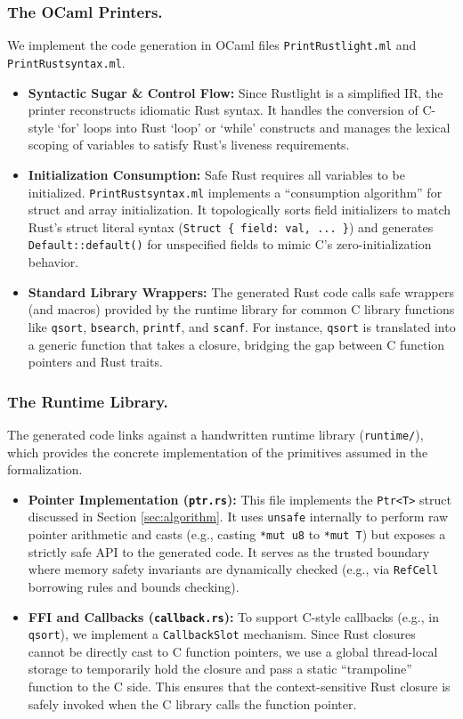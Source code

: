 \documentclass{llncs} %
\begin{document}
\subsubsection{The OCaml Printers.}
We implement the code generation in OCaml files \texttt{PrintRustlight.ml} and \texttt{PrintRustsyntax.ml}.
\begin{itemize}
    \item \textbf{Syntactic Sugar \& Control Flow:} Since Rustlight is a simplified IR, the printer reconstructs idiomatic Rust syntax. It handles the conversion of C-style `for' loops into Rust `loop' or `while' constructs and manages the lexical scoping of variables to satisfy Rust's liveness requirements.
    \item \textbf{Initialization Consumption:} Safe Rust requires all variables to be initialized. \texttt{PrintRustsyntax.ml} implements a ``consumption algorithm'' for struct and array initialization. It topologically sorts field initializers to match Rust's struct literal syntax (\texttt{Struct \{ field: val, ... \}}) and generates \texttt{Default::default()} for unspecified fields to mimic C's zero-initialization behavior.
    \item \textbf{Standard Library Wrappers:} The generated Rust code calls safe wrappers (and macros) provided by the runtime library for common C library functions like \texttt{qsort}, \texttt{bsearch}, \texttt{printf}, and \texttt{scanf}. For instance, \texttt{qsort} is translated into a generic function that takes a closure, bridging the gap between C function pointers and Rust traits.
\end{itemize}

\subsubsection{The Runtime Library.}
The generated code links against a handwritten runtime library (\texttt{runtime/}), which provides the concrete implementation of the primitives assumed in the formalization.

\begin{itemize}
    \item \textbf{Pointer Implementation (\texttt{ptr.rs}):} This file implements the \texttt{Ptr<T>} struct discussed in Section \ref{sec:algorithm}. It uses \texttt{unsafe} internally to perform raw pointer arithmetic and casts (e.g., casting \texttt{*mut u8} to \texttt{*mut T}) but exposes a strictly safe API to the generated code. It serves as the trusted boundary where memory safety invariants are dynamically checked (e.g., via \texttt{RefCell} borrowing rules and bounds checking).
    \item \textbf{FFI and Callbacks (\texttt{callback.rs}):} To support C-style callbacks (e.g., in \texttt{qsort}), we implement a \texttt{CallbackSlot} mechanism. Since Rust closures cannot be directly cast to C function pointers, we use a global thread-local storage to temporarily hold the closure and pass a static ``trampoline'' function to the C side. This ensures that the context-sensitive Rust closure is safely invoked when the C library calls the function pointer.
\end{itemize}
\end{document}
